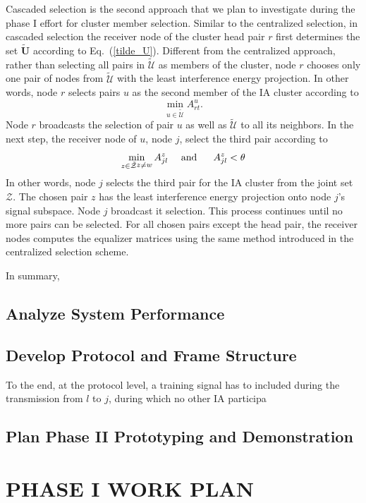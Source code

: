 \documentclass[letterpaper,11pt]{article}
\begin{document}
Cascaded selection is the second approach that we plan to investigate during the phase I effort for cluster member selection. Similar to the centralized selection, in cascaded selection the receiver node of the cluster head pair $r$ first determines the set $\tilde{\mathbf{U}}$ according to Eq.~(\ref{tilde_U}). Different from the centralized approach, rather than selecting all pairs in $\tilde{\mathcal{U}}$ as members of the cluster, node $r$ chooses only one pair of nodes from $\tilde{\mathcal{U}}$ with the least interference energy projection. In other words, node $r$ selects pairs $u$ as the second member of the IA cluster according to
$$
\min_{u\in{\tilde{\mathcal{U}}}}A^{u}_{rt}.
$$
Node $r$ broadcasts the selection of pair $u$ as well as $\tilde{\mathcal{U}}$ to all its neighbors. In the next step,  the receiver node of $u$, node $j$, select the third pair according to 
$$
\min_{\substack{z\in{\tilde{\mathcal{Z}}}}\\z\neq w}A^{z}_{jl}~~~~\textrm{and}~~~~~A^{z}_{jl}<\theta
$$
In other words, node $j$ selects the third pair for the IA cluster from the joint set $\mathcal{Z}$. The chosen pair $z$ has the least interference energy projection onto node $j$'s signal subspace. Node $j$ broadcast it selection. This process continues until no more pairs can be selected. For all chosen pairs except the head pair, the receiver nodes computes the equalizer matrices using the same method introduced in the centralized selection scheme.

In summary, 

\subsection{Analyze System Performance}


\subsection{Develop Protocol and Frame Structure}\label{sec:frame_and_protocol}

To the end, at the protocol level, a training signal has to included during the transmission from $l$ to $j$, during which no other IA participa  




\subsection{Plan Phase II Prototyping and Demonstration}

\section{PHASE I WORK PLAN}
\end{document}
